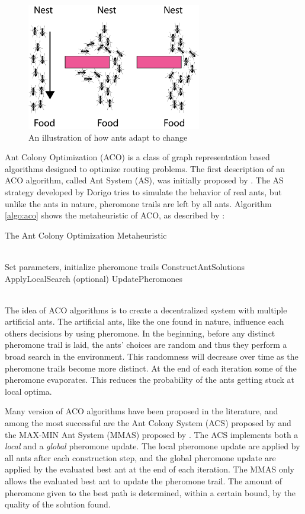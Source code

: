 \begin{figure}[H]
  \centering
  \includegraphics[width=3in]{assets/maur.png}
  \caption{An illustration of how ants adapt to change} 
   \label{fig:ants}
\end{figure}

Ant Colony Optimization (ACO) is a class of graph representation based algorithms designed to optimize routing problems. The first description of an ACO algorithm, called Ant System (AS), was initially proposed by \citet{dorigo96}. The AS strategy developed by Dorigo tries to simulate the behavior of real ants, but unlike the ants in nature, pheromone trails are left by all ants. Algorithm \ref{algo:aco} shows the metaheuristic of ACO, as described by \citet{dorigo06}: \\
\begin{algorithm}[H]
\caption{The Ant Colony Optimization Metaheuristic}
\label{algo:aco}
\begin{algorithmic}
\\ Set parameters, initialize pheromone trails
    \State ConstructAntSolutions
    \State ApplyLocalSearch (optional)
    \State UpdatePheromones
  \EndWhile
\end{algorithmic}
\end{algorithm}
~\\

The idea of ACO algorithms is to create a decentralized system with multiple artificial ants. The artificial ants, like the one found in nature, influence each others decisions by using pheromone. In the beginning, before any distinct pheromone trail is laid, the ants' choices are random and thus they perform a broad search in the environment. This randomness will decrease over time as the pheromone trails become more distinct. At the end of each iteration some of the pheromone evaporates. This reduces the probability of the ants getting stuck at local optima. 

Many version of ACO algorithms have been proposed in the literature, and among the most successful are the Ant Colony System (ACS) proposed by \citet{dorigo97} and the MAX-MIN Ant System (MMAS) proposed by \citet{stutzle06}. The ACS implements both a \textit{local} and a \textit{global} pheromone update. The local pheromone update are applied by all ants after each construction step, and the global pheromone update are applied by the evaluated best ant at the end of each iteration. The MMAS only allows the evaluated best ant to update the pheromone trail. The amount of pheromone given to the best path is determined, within a certain bound, by the quality of the solution found. 

